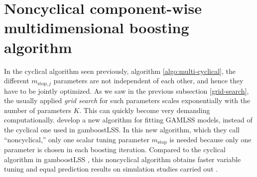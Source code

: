 \section{Noncyclical component-wise multidimensional boosting algorithm}
In the cyclical algorithm seen previously, algorithm \ref{algo:multi-cyclical}, the different $m_{\text{stop},j}$ parameters are not independent of each other, and hence they have to be jointly optimized. As we saw in the previous subsection \ref{grid-search}, the usually applied \textit{grid search} for such parameters scales exponentially with the number of parameters $K$. This can quickly become very demanding computationally. \citet{thomas2018} develop a new algorithm for fitting GAMLSS models, instead of the cyclical one used in gamboostLSS. In this new algorithm, which they call ``noncyclical,'' only one scalar tuning parameter $m_{\text{stop}}$ is needed because only one parameter is chosen in each boosting iteration. Compared to the cyclical algorithm in gamboostLSS \citep{gamboostlss-paper}, this noncyclical algorithm obtains faster variable tuning and equal prediction results on simulation studies carried out \citep{thomas2018}.

